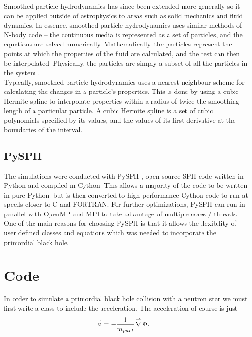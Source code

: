 Smoothed particle hydrodynamics has since been extended more generally so it can be applied outside of astrophysics to areas such as solid mechanics and fluid dynamics. In essence, smoothed particle hydrodynamics uses similar methods of N-body code -- the continuous media is represented as a set of particles, and the equations are solved numerically. Mathematically, the particles represent the points at which the properties of the fluid are calculated, and the rest can then be interpolated. Physically, the particles are simply a subset of all the particles in the system \cite{newsph}. \\

Typically, smoothed particle hydrodynamics uses a nearest neighbour scheme for calculating the changes in a particle's properties. This is done by using a cubic Hermite spline to interpolate properties within a radius of twice the smoothing length of a particular particle. A cubic Hermite spline is a set of cubic polynomials specified by its values, and the values of its first derivative at the boundaries of the interval.

\subsection{PySPH}

The simulations were conducted with PySPH \cite{pysph}, open source SPH code written in Python and compiled in Cython. This allows a majority of the code to be written in pure Python, but is then converted to high performance Cython code to run at speeds closer to C and FORTRAN. For further optimizations, PySPH can run in parallel with OpenMP and MPI to take advantage of multiple cores / threads. One of the main reasons for choosing PySPH is that it allows the flexibility of user defined classes and equations which was needed to incorporate the primordial black hole.

\section{Code}

In order to simulate a primordial black hole collision with a neutron star we must first write a class to include the acceleration. The acceleration of course is just
\begin{align*}
\overset{\rightharpoonup}a &= - \frac{1}{m_{part}} \operatorname{\overset{\rightharpoonup}\nabla} \Phi.
\end{align*}

